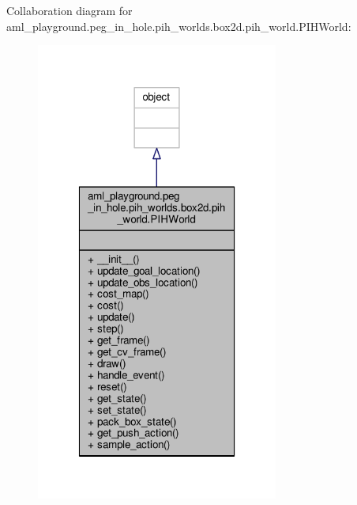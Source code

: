 Collaboration diagram for aml\-\_\-playground.\-peg\-\_\-in\-\_\-hole.\-pih\-\_\-worlds.\-box2d.\-pih\-\_\-world.\-P\-I\-H\-World\-:\nopagebreak
\begin{figure}[H]
\begin{center}
\leavevmode
\includegraphics[width=226pt]{classaml__playground_1_1peg__in__hole_1_1pih__worlds_1_1box2d_1_1pih__world_1_1_p_i_h_world__coll__graph}
\end{center}
\end{figure}
